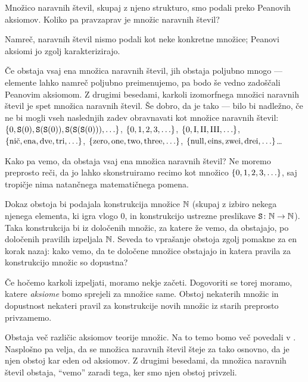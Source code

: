Množico naravnih števil, skupaj z njeno strukturo, smo podali preko Peanovih aksiomov. Koliko pa pravzaprav je množic naravnih števil?

Namreč, naravnih števil nismo podali kot neke konkretne množice; Peanovi aksiomi jo zgolj karakterizirajo. 

Če obstaja vsaj ena množica naravnih števil, jih obstaja poljubno mnogo --- elemente lahko namreč poljubno preimenujemo, pa bodo še vedno zadoščali Peanovim aksiomom. Z drugimi besedami, karkoli izomorfnega množici naravnih števil je spet množica naravnih števil. Še dobro, da je tako --- bilo bi nadležno, če ne bi mogli vseh naslednjih zadev obravnavati kot množice naravnih števil: $\set{0, \suc(0), \suc(\suc(0)), \suc(\suc(\suc(0))),\ldots}$, $\set{0, 1, 2, 3,\ldots}$, $\set{\mathrm{0}, \mathrm{I}, \mathrm{II}, \mathrm{III},\ldots}$, $\set{\text{nič}, \text{ena}, \text{dve}, \text{tri},\ldots}$, $\set{\text{zero}, \text{one}, \text{two}, \text{three},\ldots}$, $\set{\text{null}, \text{eins}, \text{zwei}, \text{drei},\ldots}$\ldots

Kako pa vemo, da obstaja vsaj ena množica naravnih števil? Ne moremo preprosto reči, da jo lahko skonstruiramo recimo kot množico $\set{0, 1, 2, 3,\ldots}$, saj tropičje nima natančnega matematičnega pomena.

Dokaz obstoja bi podajala konstrukcija množice $\mathbb{N}$ (skupaj z izbiro nekega njenega elementa, ki igra vlogo $0$, in konstrukcijo ustrezne preslikave $\mathtt{S}\colon \mathbb{N} \to \mathbb{N}$). Taka konstrukcija bi iz določenih množic, za katere že vemo, da obstajajo, po določenih pravilih izpeljala $\mathbb{N}$. Seveda to vprašanje obstoja zgolj pomakne za en korak nazaj: kako vemo, da te določene množice obstajajo in katera pravila za konstrukcijo množic so dopustna?

Če hočemo karkoli izpeljati, moramo nekje začeti. Dogovoriti se torej moramo, katere \emph{aksiome} bomo sprejeli za množice same. Obstoj nekaterih množic in dopustnost nekateri pravil za konstrukcije novih množic iz starih preprosto privzamemo.

Obstaja več različic aksiomov teorije množic. Na to temo bomo več povedali v . Nasplošno pa velja, da se množica naravnih števil šteje za tako osnovno, da je njen obstoj kar eden od aksiomov.  Z drugimi besedami, da množica naravnih števil obstaja, ``vemo'' zaradi tega, ker smo njen obstoj privzeli.

